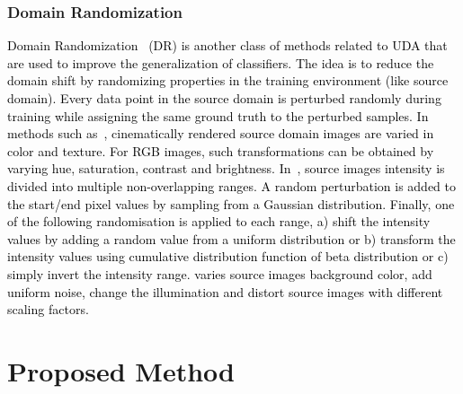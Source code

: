 \documentclass[journal,twoside,web]{IEEEtran}
\newcommand{\bb}{\textcolor{black}}
\begin{document}
\subsubsection{Domain Randomization}
\bb{Domain Randomization~\cite{tobin2017domain} (DR) is another class of methods related to UDA that are used to improve the generalization of classifiers. The idea is to reduce the domain shift by randomizing properties in the training environment (like source domain). Every data point in the source domain is perturbed randomly during training while assigning the same ground truth to the perturbed samples.  In methods such as~\cite{mahmood2018deep}, cinematically rendered source domain images are varied in color and texture.
For RGB images, such transformations can be obtained by varying hue, saturation, contrast and brightness.
In~\cite{toth2018training}, source images intensity is divided into multiple non-overlapping ranges. A random perturbation is added to the start/end pixel values by sampling from a Gaussian distribution. Finally, one of the following randomisation is applied to each range, a) shift the intensity values by adding a random value from a uniform distribution or b) transform the intensity values using cumulative distribution function of beta distribution or
c) simply invert the intensity range. \cite{zakharov2019deceptionnet} varies source images background color, add uniform noise, change the illumination and distort source images with different scaling factors.}

\section{Proposed Method}
\end{document}

